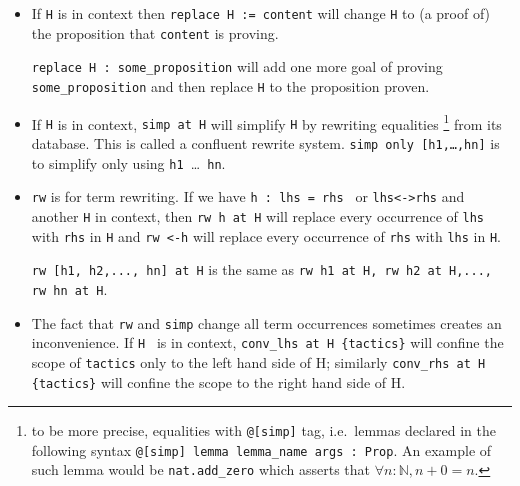 \documentclass{report}
\theoremstyle{definition}
\begin{document}
\begin{itemize}
\begin{itemize}
    \item If {\tt \small H} is in context then {\tt \small replace H := content} will change {\tt \small H} to (a proof of) the proposition that {\tt \small content} is proving.
    
    {\tt \small replace H : some\_proposition} will add one more goal of proving {\tt \small some\_proposition} and then replace {\tt \small H} to the proposition proven.
    \item If {\tt \small H} is in context, {\tt \small simp at H} will simplify {\tt \small H} by rewriting equalities \footnote{to be more precise, equalities with {\tt \scriptsize @[simp]} tag, i.e.\ lemmas declared in the following syntax {\tt \scriptsize @[simp] lemma lemma\_name args : Prop}. An example of such lemma would be {\tt \scriptsize nat.add\_zero} which asserts that $\forall n:\mathbb N, n + 0 = n$.} from its database. This is called a confluent rewrite system.
    {\tt \small simp only [h1,\dots,hn]} is to simplify only using {\tt \small h1 }\dots{\tt \small{ hn}}.
    \item {\tt \small rw} is for term rewriting. If we have {\tt \small h : lhs = rhs } or {\tt \small lhs<->rhs} and another {\tt \small H} in context, then {\tt \small rw h at H} will replace every occurrence of {\tt \small lhs} with {\tt \small rhs} in {\tt \small H} and {\tt \small rw <-h} will replace every occurrence of {\tt \small rhs} with {\tt \small lhs} in {\tt \small H}.
  
    {\tt \small rw [h1, h2,..., hn] at H} is the same as {\tt \small rw h1 at H, rw h2 at H,..., rw hn at H}.
    
    \item The fact that {\tt \small rw} and {\tt \small simp} change all term occurrences sometimes creates an inconvenience. If {\tt \small H } is in context, {\tt \small conv\_lhs at H \{tactics\}} will confine the scope of {\tt \small tactics} only to the left hand side of H; similarly {\tt \small conv\_rhs at H \{tactics\}} will confine the scope to the right hand side of H.


\end{itemize}
\end{itemize}
\end{document}
